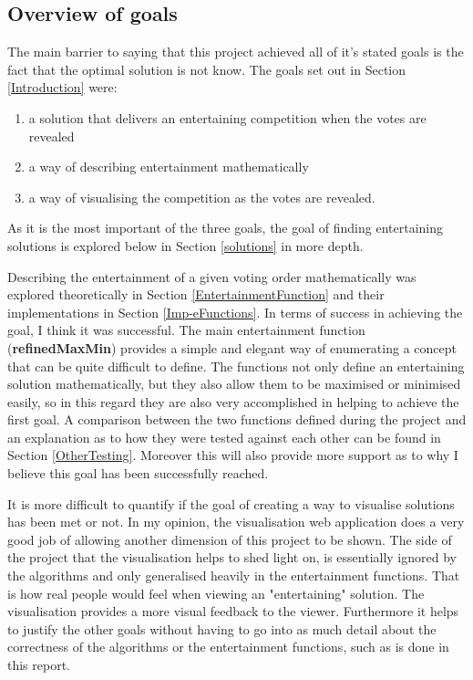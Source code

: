 \documentclass[12pt]{report}
\begin{document}
\subsection{Overview of goals}
The main barrier to saying that this project achieved all of it's stated goals is the fact that the optimal solution is not know. The goals set out in Section \ref{Introduction} were:
\begin{enumerate}
\item a solution that delivers an entertaining competition when the votes are revealed
\item a way of describing entertainment mathematically
\item a way of visualising the competition as the votes are revealed.
\end{enumerate}

As it is the most important of the three goals, the goal of finding entertaining solutions is explored below in Section \ref{solutions} in more depth.

Describing the entertainment of a given voting order mathematically was explored theoretically in Section \ref{EntertainmentFunction} and their implementations in Section \ref{Imp-eFunctions}. In terms of success in achieving the goal, I think it was successful. The main entertainment function (\textbf{refinedMaxMin}) provides a simple and elegant way of enumerating a concept that can be quite difficult to define. The functions not only define an entertaining solution mathematically, but they also allow them to be maximised or minimised easily, so in this regard they are also very accomplished in helping to achieve the first goal. A comparison between the two functions defined during the project and an explanation as to how they were tested against each other can be found in Section \ref{OtherTesting}. Moreover this will also provide more support as to why I believe this goal has been successfully reached.

It is more difficult to quantify if the goal of creating a way to visualise solutions has been met or not. In my opinion, the visualisation web application does a very good job of allowing another dimension of this project to be shown. The side of the project that the visualisation helps to shed light on, is essentially ignored by the algorithms and only generalised heavily in the entertainment functions. That is how real people would feel when viewing an "entertaining" solution. The visualisation provides a more visual feedback to the viewer. Furthermore it helps to justify the other goals without having to go into as much detail about the correctness of the algorithms or the entertainment functions, such as is done in this report.
\end{document}
